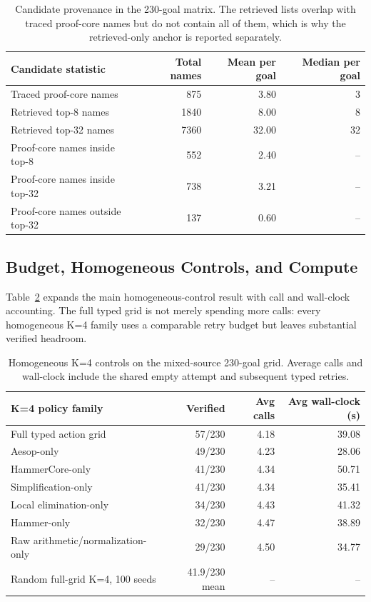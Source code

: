 \documentclass{article}
\begin{document}
\begin{table}[H]
\caption{Candidate provenance in the 230-goal matrix. The retrieved lists overlap with traced proof-core names but do not contain all of them, which is why the retrieved-only anchor is reported separately.}
\label{tab:appendix-provenance}
\centering
\small
\begin{tabular}{lrrr}
\toprule
Candidate statistic & Total names & Mean per goal & Median per goal \\
\midrule
Traced proof-core names & 875 & 3.80 & 3 \\
Retrieved top-8 names & 1840 & 8.00 & 8 \\
Retrieved top-32 names & 7360 & 32.00 & 32 \\
Proof-core names inside top-8 & 552 & 2.40 & -- \\
Proof-core names inside top-32 & 738 & 3.21 & -- \\
Proof-core names outside top-32 & 137 & 0.60 & -- \\
\bottomrule
\end{tabular}
\end{table}

\subsection{Budget, Homogeneous Controls, and Compute}

Table~\ref{tab:appendix-homogeneous} expands the main homogeneous-control result with call and wall-clock accounting. The full typed grid is not merely spending more calls: every homogeneous K=4 family uses a comparable retry budget but leaves substantial verified headroom.

\begin{table}[H]
\caption{Homogeneous K=4 controls on the mixed-source 230-goal grid. Average calls and wall-clock include the shared empty attempt and subsequent typed retries.}
\label{tab:appendix-homogeneous}
\centering
\small
\begin{tabular}{lrrr}
\toprule
K=4 policy family & Verified & Avg calls & Avg wall-clock (s) \\
\midrule
Full typed action grid & 57/230 & 4.18 & 39.08 \\
Aesop-only & 49/230 & 4.23 & 28.06 \\
HammerCore-only & 41/230 & 4.34 & 50.71 \\
Simplification-only & 41/230 & 4.34 & 35.41 \\
Local elimination-only & 34/230 & 4.43 & 41.32 \\
Hammer-only & 32/230 & 4.47 & 38.89 \\
Raw arithmetic/normalization-only & 29/230 & 4.50 & 34.77 \\
Random full-grid K=4, 100 seeds & 41.9/230 mean & -- & -- \\
\bottomrule
\end{tabular}
\end{table}
\end{document}
